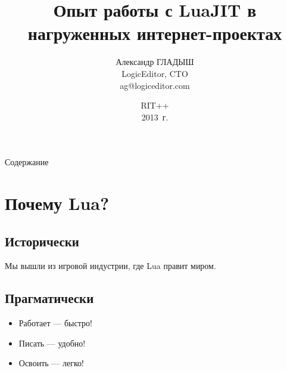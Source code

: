 \documentclass[handout]{beamer}
\title{Опыт работы с LuaJIT в нагруженных интернет-проектах}
\author{Александр ГЛАДЫШ\\LogicEditor, CTO\\ag@logiceditor.com}
\date{RIT++\\2013~г.}
\begin{document}
\maketitle


\begin{frame}{Содержание}

\tableofcontents

\end{frame}


\setlength{\parskip}{\baselineskip}


\section{Почему Lua?}


\subsection*{Исторически}

\begin{frame}
  Мы вышли из игровой индустрии, где Lua правит миром.
\end{frame}


\subsection*{Прагматически}

\begin{frame}
  \begin{itemize}
    \item Работает — быстро!
    \item Писать — удобно!
    \item Освоить — легко!
  \end{itemize}
\end{frame}

\end{document}
